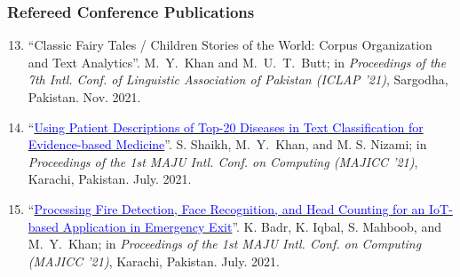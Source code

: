 \documentclass[a4paper, 10pt]{article}
\begin{document}
\subsubsection*{{Refereed Conference Publications}}
\begin{enumerate}
\setcounter{enumi}{12}
\itemsep-4pt






\item ``Classic Fairy Tales / Children Stories of the World: Corpus Organization and Text Analytics''. \textcolor{NavyBlue}{M.~Y.~Khan} and M.~U.~T.~Butt; in \emph{Proceedings of the 7th Intl. Conf. of Linguistic Association of Pakistan (ICLAP '21)}, Sargodha, Pakistan. Nov. 2021. %

\item ``\href{https://ieeexplore.ieee.org/document/9526252}{\textcolor{blue}{Using Patient Descriptions of Top-20 Diseases in Text Classification for Evidence-based Medicine}}''. S. Shaikh, \textcolor{NavyBlue}{M.~Y.~Khan}, and M. S. Nizami; in \emph{Proceedings of the 1st MAJU Intl. Conf. on Computing (MAJICC '21)}, Karachi, Pakistan. July. 2021.

\item ``\href{https://ieeexplore.ieee.org/document/9526261}{\textcolor{blue}{Processing Fire Detection, Face Recognition, and Head Counting for an IoT-based Application in Emergency Exit}}''. K. Badr, K. Iqbal, S. Mahboob, and \textcolor{NavyBlue}{M.~Y.~Khan}; in \emph{Proceedings of the 1st MAJU Intl. Conf. on Computing (MAJICC '21)}, Karachi, Pakistan. July. 2021.


\end{enumerate}
\end{document}
